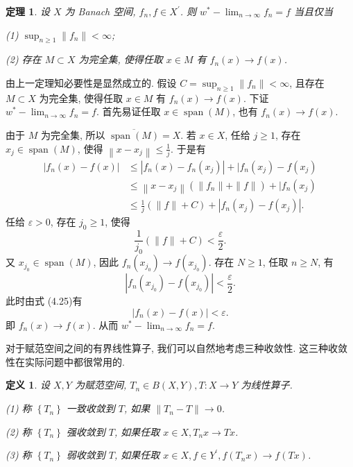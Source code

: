 \documentclass[openany]{ctexbook}
\makeatletter
\theoremstyle{kaiti}
\newtheorem{definition}{定义}[section]
\newtheorem{theorem}{定理}[section]
\theoremstyle{normal}
\renewenvironment{proof}[1][\proofname]{\par
    \pushQED{\qed}%
    \normalfont \topsep6\p@\@plus6\p@\relax
    \trivlist
    \item\relax
    {\heiti #1}\hspace{2\labelsep}\ignorespaces
  }{%
    \popQED\endtrivlist\@endpefalse
  }
\makeatother
\begin{document}
\begin{theorem}
设 $X$ 为 Banach 空间, $f_n, f \in X^{\prime}$. 则 $w^{*}-\lim_{n \rightarrow \infty} f_n=f$ 当且仅当

(1) $\sup_{n \geqslant 1}\left\|f_n\right\|<\infty$;

(2) 存在 $M \subset X$ 为完全集, 使得任取 $x \in M$ 有 $f_n(x) \rightarrow f(x)$.
\end{theorem}

\begin{proof}
由上一定理知必要性是显然成立的. 假设 $C=\sup_{n \geqslant 1}\left\|f_n\right\|<\infty$, 且存在 $M \subset X$ 为完全集, 使得任取 $x \in M$ 有 $f_n(x) \rightarrow f(x)$. 下证 $w^{*}-\lim_{n \rightarrow \infty} f_n=f$. 首先易证任取 $x \in \operatorname{span}(M)$, 也有 $f_n(x) \rightarrow f(x)$.

由于 $M$ 为完全集, 所以 $\overline{\operatorname{span}(M)}=X$. 若 $x \in X$, 任给 $j \geqslant 1$, 存在 $x_{j} \in \operatorname{span}(M)$, 使得 $\left\|x-x_{j}\right\| \leqslant \frac{1}{j}$. 于是有
\begin{equation}
  \begin{aligned}
    \left|f_n(x)-f(x)\right| & \leqslant\left|f_n(x)-f_n\left(x_{j}\right)\right|+\mid f_n\left(x_{j}\right)-f\left(x_{j}\right) \\
    & \leqslant\left\|x-x_{j}\right\|\left(\left\|f_n\right\|+\|f\|\right)+\mid f_n\left(x_{j}\right) \\
    & \leqslant \frac{1}{j}(\|f\|+C)+\left|f_n\left(x_{j}\right)-f\left(x_{j}\right)\right|.
  \end{aligned}
\end{equation}
任给 $\varepsilon>0$, 存在 $j_0 \geqslant 1$, 使得
$$
\frac{1}{j_0}(\|f\|+C)<\frac{\varepsilon}{2}.
$$
又 $x_{j_0} \in \operatorname{span}(M)$, 因此 $f_n\left(x_{j_0}\right) \rightarrow f\left(x_{j_0}\right)$. 存在 $N \geqslant 1$, 任取 $n \geqslant N$, 有
$$
\left|f_n\left(x_{j_0}\right)-f\left(x_{j_0}\right)\right|<\frac{\varepsilon}{2}.
$$
此时由式 (4.25)有
$$
\left|f_n(x)-f(x)\right|<\varepsilon.
$$
即 $f_n(x) \rightarrow f(x)$. 从而 $w^{*}-\lim_{n \rightarrow \infty} f_n=f$.
\end{proof}

对于赋范空间之间的有界线性算子, 我们可以自然地考虑三种收敛性. 这三种收敛性在实际问题中都很常用的.

\begin{definition}
设 $X, Y$ 为赋范空间, $T_n \in B(X, Y), T: X \rightarrow Y$ 为线性算子.

(1) 称 $\left\{T_n\right\}$ 一致收敛到 $T$, 如果 $\left\|T_n-T\right\| \rightarrow 0$.

(2) 称 $\left\{T_n\right\}$ 强收敛到 $T$, 如果任取 $x \in X, T_n x \rightarrow T x$.

(3) 称 $\left\{T_n\right\}$ 弱收敛到 $T$, 如果任取 $x \in X, f \in Y^{\prime}, f\left(T_n x\right) \rightarrow f(T x)$.
\end{definition}
\end{document}
